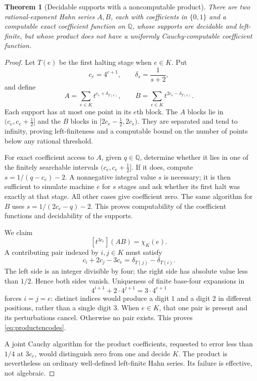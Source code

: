 \documentclass[11pt,letterpaper]{article}
\numberwithin{equation}{section}
\newtheorem{theorem}{Theorem}[section]
\theoremstyle{definition}
\theoremstyle{remark}
\newcommand{\Q}{\mathbb Q}
\newcommand{\coef}[2]{[t^{#1}]#2}
\begin{document}
\begin{theorem}[Decidable supports with a noncomputable product]
\label{thm:badproduct}
There are two rational-exponent Hahn series $A,B$, each with coefficients
in $\{0,1\}$ and a computable exact coefficient function on $\Q$, whose
supports are decidable and left-finite, but whose product does not have a
uniformly Cauchy-computable coefficient function.
\end{theorem}
\begin{proof}
Let $T(e)$ be the first halting stage when $e\in K$. Put
\[
 c_e=4^{e+1},\qquad \delta_s=\frac1{s+2},
\]
and define
\begin{equation}\label{eq:badAB}
 A=\sum_{e\in K}t^{c_e+\delta_{T(e)}},\qquad
 B=\sum_{e\in K}t^{2c_e-\delta_{T(e)}}.
\end{equation}
Each support has at most one point in its $e$th block. The $A$ blocks lie
in $(c_e,c_e+\tfrac12]$ and the $B$ blocks in
$[2c_e-\tfrac12,2c_e)$. They are separated and tend to infinity, proving
left-finiteness and a computable bound on the number of points below any
rational threshold.

For exact coefficient access to $A$, given $q\in\Q$, determine whether it
lies in one of the finitely searchable intervals
$(c_e,c_e+\tfrac12]$. If it does, compute
$s=1/(q-c_e)-2$. A nonnegative integral value $s$ is necessary; it is then
sufficient to simulate machine $e$ for $s$ stages and ask whether its first
halt was exactly at that stage. All other cases give coefficient zero.
The same algorithm for $B$ uses $s=1/(2c_e-q)-2$. This proves computability
of the coefficient functions and decidability of the supports.

We claim
\begin{equation}\label{eq:productencodes}
 \coef{3c_e}{(AB)}=\chi_K(e).
\end{equation}
A contributing pair indexed by $i,j\in K$ must satisfy
\[
 c_i+2c_j-3c_e=\delta_{T(j)}-\delta_{T(i)}.
\]
The left side is an integer divisible by four; the right side has absolute
value less than $1/2$. Hence both sides vanish. Uniqueness of finite
base-four expansions in
\[
 4^{i+1}+2\cdot4^{j+1}=3\cdot4^{e+1}
\]
forces $i=j=e$: distinct indices would produce a digit $1$ and a digit $2$
in different positions, rather than a single digit $3$. When $e\in K$,
that one pair is present and its perturbations cancel. Otherwise no pair
exists. This proves \eqref{eq:productencodes}.

A joint Cauchy algorithm for the product coefficients, requested to error
less than $1/4$ at $3c_e$, would distinguish zero from one and decide $K$.
The product is nevertheless an ordinary well-defined left-finite Hahn
series. Its failure is effective, not algebraic.
\end{proof}
\end{document}
